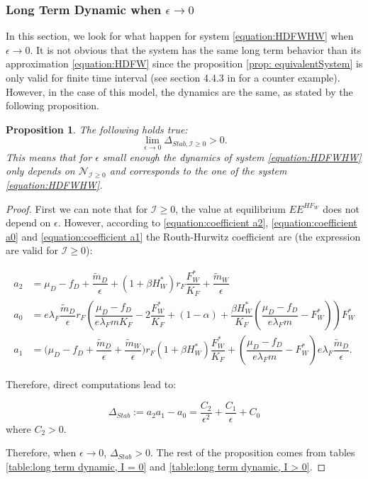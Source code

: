 \documentclass{article}
\newcommand{\lfw}{\lambda_{F}}
\newcommand{\lfw}{\lambda_{F}}
\newcommand{\cI}{\mathcal{I}}
\newtheorem{prop}[theorem]{Proposition}
\theoremstyle{definition}
\theoremstyle{remark}
\begin{document}
\subsubsection{Long Term Dynamic when $\epsilon \rightarrow 0$}
In this section, we look for what happen for system \eqref{equation:HDFWHW} when $\epsilon \rightarrow 0$. It is not obvious that the system has the same long term behavior than its approximation \eqref{equation:HDFW} since the proposition \ref{prop: equivalentSystem} is only valid for finite time interval (see section 4.4.3 in \cite{banasiak_methods_2014} for a counter example). However, in the case of this model, the dynamics are the same, as stated by the following proposition.

\begin{prop}
The following holds true:
$$
\lim\limits_{ \epsilon \rightarrow 0}{\Delta_{Stab, \cI \geq 0}} > 0.
$$
This means that for $\epsilon$ small enough the dynamics of system \eqref{equation:HDFWHW} only depends on $\mathcal{N}_{\cI \geq 0}$ and corresponds to the one of the system \eqref{equation:HDFWHW}.
\end{prop}
\begin{proof}
First we can note that for $\cI \geq 0$, the value at equilibrium $EE^{HF_W}$ does not depend on $\epsilon$. However, according to \eqref{equation:coefficient a2}, \eqref{equation:coefficient a0} and \eqref{equation:coefficient a1} the Routh-Hurwitz coefficient are (the expression are valid for $\cI \geq 0$):

\begin{align*}
a_2  &= \mu_D - f_D + \dfrac{\tilde m_D}{\epsilon} + (1+\beta H_W^*)r_F \dfrac{F_W^*}{K_F} + \dfrac{\tilde m_W}{\epsilon} \\
a_0 &= e \lfw \dfrac{\tilde m_D}{\epsilon} r_F \left(\dfrac{\mu_D -f_D }{e \lfw m K_F} - 2\dfrac{F_W^*}{K_F} + (1-\alpha) + \dfrac{\beta H_W^*}{K_F} \left(\dfrac{\mu_D -f_D }{e \lfw m} - F_W^*\right) \right) F_W^* \\
a_1 &= \Big( \mu_D  -f_D + \dfrac{\tilde m_D}{\epsilon} + \dfrac{\tilde m_W}{\epsilon} \Big) r_F(1+ \beta H_W^*) \dfrac{F^*_W}{K_F} + \left(\dfrac{\mu_D -f_D}{e\lfw m} - F_W^*\right) e \lfw \dfrac{\tilde m_D}{\epsilon}.
\end{align*}

Therefore, direct computations lead to:

\begin{equation*}
\Delta_{Stab} := a_2 a_1 - a_0 = \dfrac{C_2}{\epsilon^2} + \dfrac{C_1}{\epsilon} + C_0
\end{equation*}
where $C_2 > 0$.


Therefore, when $\epsilon \rightarrow 0$, $\Delta_{Stab} > 0$. The rest of the proposition comes from tables \ref{table:long term dynamic, I = 0} and \ref{table:long term dynamic, I > 0}.
\end{proof}
\end{document}
